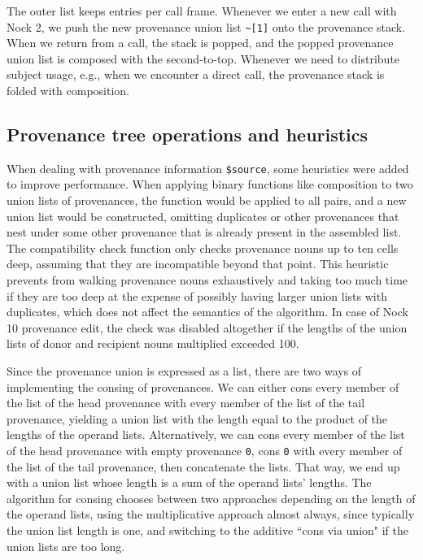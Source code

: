 \documentclass[twoside]{article}
\begin{document}
The outer list keeps entries per call frame.  Whenever we enter a new call with Nock 2, we push the new provenance union list \lstinline[style=inlinecode]{~[1]} onto the provenance stack. When we return from a call, the stack is popped, and the popped provenance union list is composed with the second-to-top.  Whenever we need to distribute subject usage, e.g., when we encounter a direct call, the provenance stack is folded with composition.

\subsection{Provenance tree operations and heuristics}

\sloppy
When dealing with provenance information \lstinline[style=inlinecode]{$source}, some heuristics were added to improve performance.  When applying binary functions like composition to two union lists of provenances, the function would be applied to all pairs, and a new union list would be constructed, omitting duplicates or other provenances that nest under some other provenance that is already present in the assembled list.  The compatibility check function only checks provenance nouns up to ten cells deep, assuming that they are incompatible beyond that point.  This heuristic prevents from walking provenance nouns exhaustively and taking too much time if they are too deep at the expense of possibly having larger union lists with duplicates, which does not affect the semantics of the algorithm. In case of Nock 10 provenance edit, the check was disabled altogether if the lengths of the union lists of donor and recipient nouns multiplied exceeded 100.

Since the provenance union is expressed as a list, there are two ways of implementing the consing of provenances.  We can either cons every member of the list of the head provenance with every member of the list of the tail provenance, yielding a union list with the length equal to the product of the lengths of the operand lists.  Alternatively, we can cons every member of the list of the head provenance with empty provenance \lstinline[style=inlinecode]{0}, cons \lstinline[style=inlinecode]{0} with every member of the list of the tail provenance, then concatenate the lists.  That way, we end up with a union list whose length is a sum of the operand lists' lengths.  The algorithm for consing chooses between two approaches depending on the length of the operand lists, using the multiplicative approach almost always, since typically the union list length is one, and switching to the additive ``cons via union" if the union lists are too long.
\end{document}
